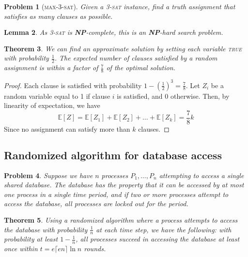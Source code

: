 \documentclass[10pt, oneside, reqno]{amsart}
\theoremstyle{plain}%
\newtheorem{thm}{Theorem}[section]
\newtheorem{prob}[thm]{Problem}
\newtheorem{lem}[thm]{Lemma}
\theoremstyle{definition}
\theoremstyle{remark}
\newcommand{\expc}[1]{\mathbb{E}\left[#1\right]}
\begin{document}
\begin{prob}[\textsc{max-3-sat}]
	Given a \textsc{3-sat} instance, find a truth assignment that satisfies as many clauses as possible.
\end{prob}

\begin{lem}
	As \textsc{3-sat} is \textbf{NP}-complete, this is an \textbf{NP}-hard search problem. 
\end{lem}

\begin{thm}
	We can find an approximate solution by setting each variable \textsc{true} with probability $\frac{1}{2}$.  The expected number of clauses satisfied by a random assignment is within a factor of $\frac{7}{8}$ of the optimal solution.
\end{thm}

\begin{proof}
	Each clause is satisfied with probability $1 - \left(\frac{1}{2}\right)^3 = \frac{7}{8}$.  Let $Z_i$ be a random variable equal to 1 if clause $i$ is satisfied, and $0$ otherwise.  Then, by linearity of expectation, we have\[
		\expc{Z} = \expc{Z_1} + \expc{Z_2} + \dots + \expc{Z_k} = \frac{7}{8}k
	\]  Since no assignment can satisfy more than $k$ clauses. 
\end{proof}
\subsection{Randomized algorithm for database access} %
\label{sub:randomized_algorithm_for_database_access}

\begin{prob}
	Suppose we have $n$ processes $P_1, \dots, P_n$ attempting to access a single shared database.  The database has the property that it can be accessed by at most one process in a single time period, and if two or more processes attempt to access the database, all processes are locked out for the period.
\end{prob}

\begin{thm}
	Using a randomized algorithm where a process attempts to access the database with probability $\frac{1}{n}$ at each time step, we have the following: with probability at least $1-\frac{1}{n}$, all processes succeed in accessing the database at least once within $t = e \lceil e n \rceil \ln n$ rounds. 
\end{thm}
\end{document}
